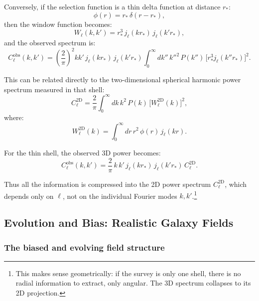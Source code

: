 Conversely, if the selection function is a thin delta function at distance $r_*$:
\begin{equation}
\phi(r) = r_*\,\delta(r-r_*),
\label{eq:thin_shell_selection}
\end{equation}
then the window function becomes:
\begin{equation}
W_\ell(k,k') = r_*^3\,j_\ell(kr_*)\,j_\ell(k'r_*),
\label{eq:window_thin_shell}
\end{equation}
and the observed spectrum is:
\begin{equation}
C^{\text{obs}}_\ell(k,k') = \left(\frac{2}{\pi}\right)^2 kk'\,j_\ell(kr_*)\,j_\ell(k'r_*)
\int_0^\infty dk''\,k''^2\,P(k'')\,\bigl[r_*^3 j_\ell(k''r_*)\bigr]^2.
\label{eq:observed_power_thin_shell}
\end{equation}

This can be related directly to the two-dimensional spherical harmonic power spectrum measured in that shell:
\begin{equation}
C^{\text{2D}}_\ell = \frac{2}{\pi}\int_0^\infty dk\,k^2\,P(k)\,\bigl[W^{\text{2D}}_\ell(k)\bigr]^2,
\label{eq:2d_power_spectrum}
\end{equation}
where:
\begin{equation}
W^{\text{2D}}_\ell(k) = \int_0^\infty dr\,r^2\,\phi(r)\,j_\ell(kr).
\label{eq:2d_window}
\end{equation}

For the thin shell, the observed 3D power becomes:
\begin{equation}
C^{\text{obs}}_\ell(k,k') = \frac{2}{\pi}\,k\,k'\,j_\ell(kr_*)\,j_\ell(k'r_*)\,C^{\text{2D}}_\ell.
\label{eq:connection_2d_3d}
\end{equation}

Thus all the information is compressed into the 2D power spectrum $C^{\text{2D}}_\ell$, which depends only on $\ell$,
not on the individual Fourier modes $k,k'$.\footnote{This makes sense geometrically: if the survey is only one shell,
there is no radial information to extract, only angular. The 3D spectrum collapses to its 2D projection.}

\subsection{Evolution and Bias: Realistic Galaxy Fields}

\subsubsection{The biased and evolving field structure}

